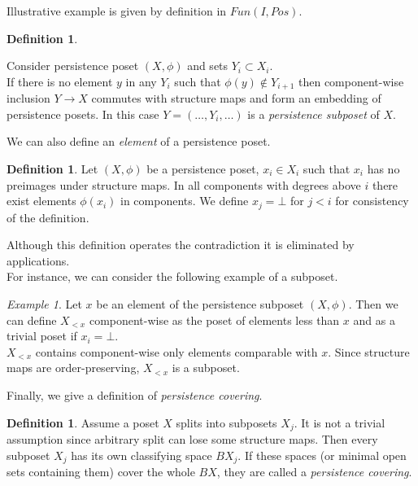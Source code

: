 \documentclass[a4paper, 12pt]{article}
\newcounter{stmcounter}[section]
\numberwithin{equation}{section}
\theoremstyle{definition}
\newtheorem{definition}[stmcounter]{Definition}
\theoremstyle{remark}
\newtheorem{example}[stmcounter]{Example}
\newcommand{\define}[1]{{\textit{#1}}}
\begin{document}
Illustrative example is given by definition in $Fun(I, Pos)$.\\

\begin{definition} ~ \par
  Consider persistence poset $(X,\phi)$ and sets $Y_i \subset X_i$.\\

  If there is no element $y$ in any $Y_i$ such that $\phi(y) \not\in Y_{i+1}$ then component-wise inclusion $Y \to X$ commutes with structure maps and form an embedding of persistence posets. In this case $Y=(\ldots,Y_i,\ldots)$ is a \define {persistence subposet} of $X$.
\end{definition}

We can also define an \define{element} of a persistence poset.
\begin{definition}
  Let $(X,\phi)$ be a persistence poset, $x_i \in X_i$ such that $x_i$ has no preimages under structure maps. In all components with degrees above $i$ there exist elements $\phi(x_i)$ in components. We define $x_j = \bot$ for $j < i$ for consistency of the definition.
\end{definition}

Although this definition operates the contradiction it is eliminated by applications.\\
For instance, we can consider the following example of a subposet.
\begin{example}
  Let $x$ be an element of the persistence subposet $(X, \phi)$. Then we can define $X_{<x}$ component-wise as the poset of elements less than $x$ and as a trivial poset if $x_i = \bot$.\\

  $X_{<x}$ contains component-wise only elements comparable with $x$. Since structure maps are order-preserving, $X_{<x}$ is a subposet.
\end{example}

Finally, we give a definition of \define{persistence covering}.\\

\begin{definition}
  Assume a poset $X$ splits into subposets $X_j$. It is not a trivial assumption since arbitrary split can lose some structure maps. Then every subposet $X_j$ has its own classifying space $BX_j$. If these spaces (or minimal open sets containing them) cover the whole $BX$, they are called a \define{persistence covering}.
\end{definition}
\end{document}
